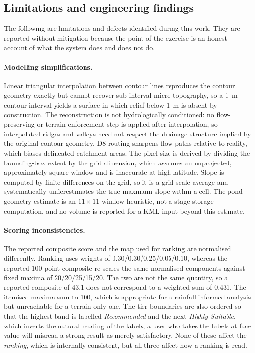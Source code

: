 \documentclass[sigconf,review,10pt]{acmart}
\begin{document}
\subsection{Limitations and engineering findings}

The following are limitations and defects identified during this work. They
are reported without mitigation because the point of the exercise is an
honest account of what the system does and does not do.

\paragraph{Modelling simplifications.}
Linear triangular interpolation between contour lines reproduces the
contour geometry exactly but cannot recover sub-interval micro-topography,
so a 1~m contour interval yields a surface in which relief below 1~m is
absent by construction. The reconstruction is not hydrologically
conditioned: no flow-preserving or terrain-enforcement step is applied
after interpolation, so interpolated ridges and valleys need not respect
the drainage structure implied by the original contour geometry. D8
routing sharpens flow paths relative to reality, which biases delineated
catchment areas. The pixel size is derived by dividing the bounding-box
extent by the grid dimension, which assumes an unprojected, approximately
square window and is inaccurate at high latitude. Slope is computed by
finite differences on the grid, so it is a grid-scale average and
systematically underestimates the true maximum slope within a cell. The
pond geometry estimate is an $11\times11$ window heuristic, not a
stage-storage computation, and no volume is reported for a KML input
beyond this estimate.

\paragraph{Scoring inconsistencies.}
The reported composite score and the map used for ranking are normalised
differently. Ranking uses weights of 0.30/0.30/0.25/0.05/0.10, whereas the
reported 100-point composite re-scales the same normalised components
against fixed maxima of 20/20/25/15/20. The two are not the same
quantity, so a reported composite of 43.1 does not correspond to a
weighted sum of 0.431. The itemised maxima sum to 100, which is
appropriate for a rainfall-informed analysis but unreachable for a
terrain-only one. The tier boundaries are also ordered so that the
highest band is labelled \emph{Recommended} and the next \emph{Highly
Suitable}, which inverts the natural reading of the labels; a user who
takes the labels at face value will misread a strong result as merely
satisfactory. None of these affect the \emph{ranking}, which is internally
consistent, but all three affect how a ranking is read.
\end{document}
